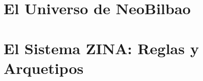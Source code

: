 \documentclass[10pt,a5paper,oneside]{book}
\begin{document}
\frontmatter

\tableofcontents

\mainmatter

\part{El Universo de NeoBilbao}






\part{El Sistema ZINA: Reglas y Arquetipos}





\end{document}
